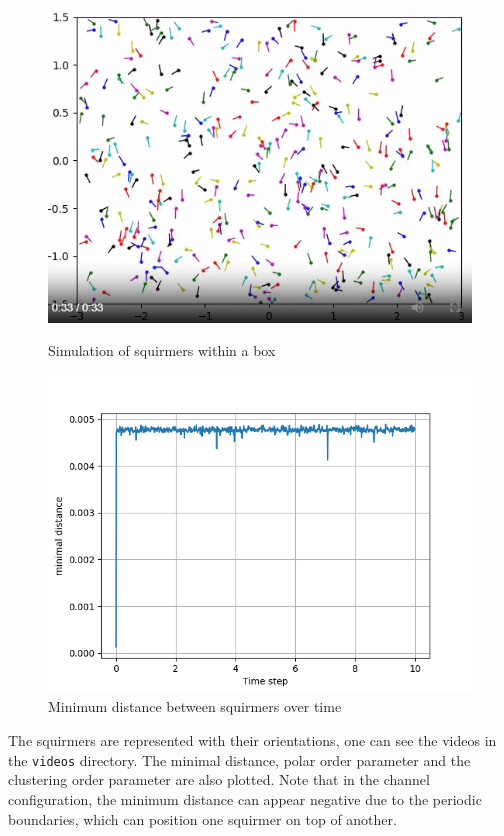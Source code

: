 \documentclass{article}
\begin{document}
\begin{figure}
    \begin{minipage}{0.49\textwidth}
        \includegraphics[width=1\textwidth]{Presentation/images/simulation.png}
        \caption{Simulation of squirmers within a box}
    \end{minipage}\hfill
    \begin{minipage}{0.49\textwidth}
        \includegraphics[width=1\textwidth]{videos/min_dist_box2.png}
        \caption{\footnotesize Minimum distance between squirmers over time}
    \end{minipage}
\end{figure}
The squirmers are represented with their orientations, one can see the videos in the \texttt{videos} directory. The minimal
distance, polar order parameter and the clustering order parameter are also plotted. 
Note that in the channel configuration, the minimum distance can appear negative due to the periodic boundaries, 
which can position one squirmer on top of another.
\end{document}
